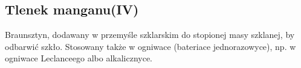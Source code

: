 \subsection{Tlenek manganu(IV) }
Braunsztyn, dodawany w przemyśle szklarskim do stopionej masy szklanej, by odbarwić szkło.
Stosowany także w ogniwace (bateriace jednorazowyce), np. w ogniwace Leclanceego albo alkalicznyce.
